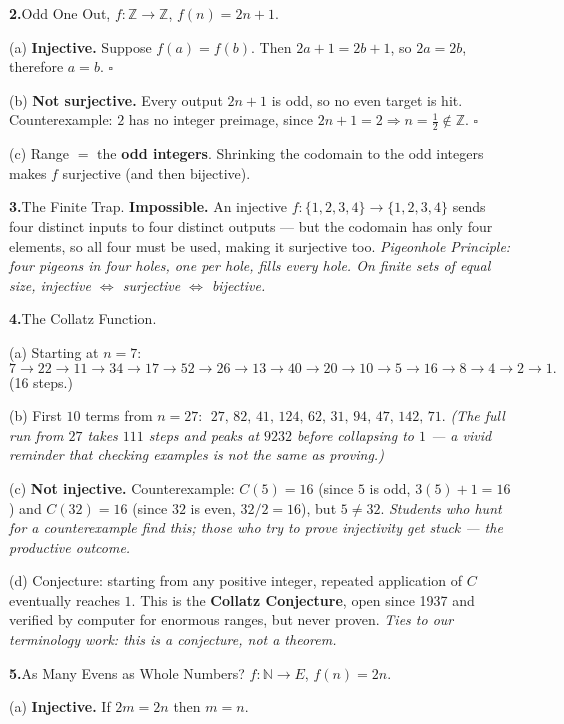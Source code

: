 \documentclass[12pt]{article}
\begin{document}
\bigskip
\textbf{2.}\quad Odd One Out, $f\colon \mathbb{Z}\to\mathbb{Z}$, $f(n)=2n+1$.

(a)\; \textbf{Injective.} Suppose $f(a)=f(b)$. Then $2a+1=2b+1$, so $2a=2b$, therefore $a=b$. $\square$

(b)\; \textbf{Not surjective.} Every output $2n+1$ is odd, so no even target is hit. Counterexample: $2$ has no
integer preimage, since $2n+1=2 \Rightarrow n=\tfrac12 \notin \mathbb{Z}$. $\square$

(c)\; Range $=$ the \textbf{odd integers}. Shrinking the codomain to the odd integers makes $f$ surjective (and
then bijective).

\bigskip
\textbf{3.}\quad The Finite Trap. \textbf{Impossible.} An injective $f\colon \{1,2,3,4\}\to\{1,2,3,4\}$ sends
four distinct inputs to four distinct outputs --- but the codomain has only four elements, so all four must be
used, making it surjective too. \textit{Pigeonhole Principle: four pigeons in four holes, one per hole, fills
every hole. On finite sets of equal size, injective $\iff$ surjective $\iff$ bijective.}

\bigskip
\textbf{4.}\quad The Collatz Function.

(a)\; Starting at $n=7$:
\[
  7 \to 22 \to 11 \to 34 \to 17 \to 52 \to 26 \to 13 \to 40 \to 20 \to 10 \to 5 \to 16 \to 8 \to 4 \to 2 \to 1.
\]
(16 steps.)

(b)\; First $10$ terms from $n=27$: $\;27,\,82,\,41,\,124,\,62,\,31,\,94,\,47,\,142,\,71.$
\textit{(The full run from $27$ takes $111$ steps and peaks at $9232$ before collapsing to $1$ --- a vivid
reminder that checking examples is not the same as proving.)}

(c)\; \textbf{Not injective.} Counterexample: $C(5) = 16$ (since $5$ is odd, $3(5)+1 = 16$) and $C(32) = 16$
(since $32$ is even, $32/2 = 16$), but $5 \ne 32$. \textit{Students who hunt for a counterexample find this;
those who try to prove injectivity get stuck --- the productive outcome.}

(d)\; Conjecture: starting from any positive integer, repeated application of $C$ eventually reaches $1$. This is
the \textbf{Collatz Conjecture}, open since 1937 and verified by computer for enormous ranges, but never proven.
\textit{Ties to our terminology work: this is a conjecture, not a theorem.}

\bigskip
\textbf{5.}\quad As Many Evens as Whole Numbers? $f\colon \mathbb{N}\to E$, $f(n)=2n$.

(a)\; \textbf{Injective.} If $2m = 2n$ then $m = n$.
\end{document}
